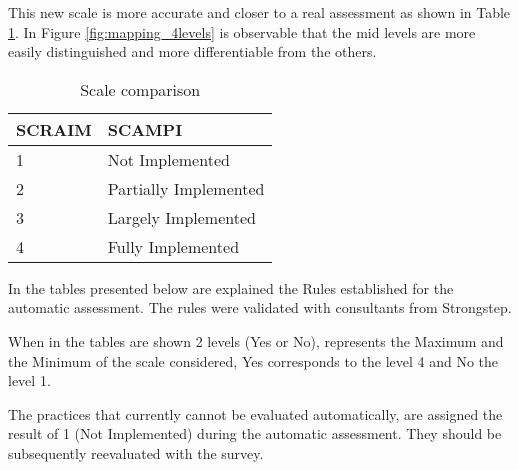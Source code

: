 This new scale is more accurate and closer to a real assessment as shown in Table \ref{tab:rules}. In Figure \ref{fig:mapping_4levels} is observable that the mid levels are more easily distinguished and more differentiable from the others.

\begin{table}[h]
	\centering
	\caption{Scale comparison}
	\begin{tabular}{|p{2cm}|p{4cm}|}
		\hline
		SCRAIM   & SCAMPI    \\
		\hline
		1 & Not Implemented\\
				\hline
				2 & Partially Implemented\\
				\hline
				3 & Largely Implemented\\
				\hline
				4 & Fully Implemented\\
				\hline
	\end{tabular}
	\label{tab:rules}
\end{table}

In the tables presented below are explained the Rules established for the automatic assessment. The rules were validated with consultants from Strongstep.

When in the tables are shown 2 levels (Yes or No), represents the Maximum and the Minimum of the scale considered, Yes corresponds to the level 4 and No the level 1.

The practices that currently cannot be evaluated automatically, are assigned the result of 1 (Not Implemented) during the automatic assessment. They should be subsequently reevaluated with the survey.


\newpage













